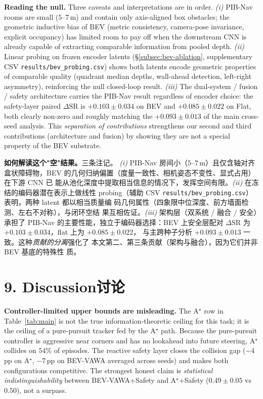 \documentclass[11pt,a4paper]{article}
\newcommand{\en}[1]{\par\noindent #1\par\vspace{0.15em}}
\newcommand{\zh}[1]{\par\noindent\color{zhcol}\hspace{0.5em}#1\par\color{black}\vspace{0.6em}}
\newcommand{\bisec}[2]{\section[#1]{#1\quad\normalfont\small\color{zhcol}\textsf{#2}}}
\begin{document}
\en{\textbf{Reading the null.} Three caveats and interpretations
are in order. \emph{(i)} PIB-Nav rooms are small ($5$--$7\,$m) and
contain only axis-aligned box obstacles; the geometric inductive bias
of BEV (metric consistency, camera-pose invariance, explicit
occupancy) has limited room to pay off when the downstream CNN is
already capable of extracting comparable information from pooled
depth. \emph{(ii)} Linear probing on frozen encoder latents
(\S\ref{subsec:bev-ablation}, supplementary CSV
\texttt{results/bev\_probing.csv}) shows both latents encode geometric
properties of comparable quality (quadrant median depths, wall-ahead
detection, left-right asymmetry), reinforcing the null closed-loop
result. \emph{(iii)} The dual-system / fusion / safety architecture
carries the PIB-Nav result regardless of encoder choice: the
safety-layer paired $\Delta\mathrm{SR}$ is $+0.103 \pm 0.034$ on BEV
and $+0.085 \pm 0.022$ on Flat, both clearly non-zero and roughly
matching the $+0.093 \pm 0.013$ of the main cross-seed analysis. This
\emph{separation of contributions} strengthens our second and third
contributions (architecture and fusion) by showing they are not a
special property of the BEV substrate.}

\zh{\textsf{\textbf{如何解读这个"空"结果。}三条注记。
\emph{(i)} PIB-Nav 房间小（$5$--$7\,$m）且仅含轴对齐盒状障碍物，BEV
的几何归纳偏置（度量一致性、相机姿态不变性、显式占用）在下游 CNN 已
能从池化深度中提取相当信息的情况下，发挥空间有限。\emph{(ii)} 在冻
结的编码器潜在表示上做线性 probing（辅助 CSV
\texttt{results/bev\_probing.csv}）表明，两种 latent 都以相当质量编
码几何属性（四象限中位深度、前方墙面检测、左右不对称），与闭环空结
果互相佐证。\emph{(iii)} 架构层（双系统 / 融合 / 安全）承担了
PIB-Nav 的主要性能，独立于编码器选择：BEV 上安全层配对
$\Delta\mathrm{SR}$ 为 $+0.103 \pm 0.034$，flat 上为 $+0.085 \pm 0.022$，
与主跨种子分析 $+0.093 \pm 0.013$ 一致。这种\emph{贡献的分离}强化了
本文第二、第三条贡献（架构与融合），因为它们并非 BEV 基底的特殊性
质。}}

\bisec{9. Discussion}{讨论}

\en{\textbf{Controller-limited upper bounds are misleading.} The A$^\star$
row in Table~\ref{tab:main} is not the true information-theoretic ceiling
for this task; it is the ceiling of a pure-pursuit tracker fed by the
A$^\star$ path. Because the pure-pursuit controller is aggressive near
corners and has no lookahead into future steering, A$^\star$ collides on
$54\%$ of episodes. The reactive safety layer closes the collision gap
($-4$\,pp on A$^\star$, $-7$\,pp on BEV-VAWA averaged across seeds) and
makes both configurations competitive. The strongest honest claim is
\emph{statistical indistinguishability} between BEV-VAWA+Safety and
A$^\star$+Safety ($0.49\pm 0.05$ vs $0.50$), not a surpass.}
\end{document}
